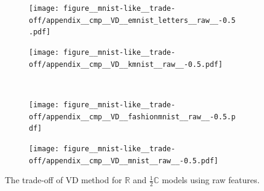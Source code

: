 \documentclass[a4paper]{extarticle}
\newcommand{\real}{\mathbb{R}}
\newcommand{\cplx}{\mathbb{C}}
\begin{document}
\begin{figure}[ht]
  \centering
  \begin{subfigure}[b]{0.5\textwidth}
    \centering
    \texttt{[image: figure\_\_mnist-like\_\_trade-off/appendix\_\_cmp\_\_VD\_\_emnist\_letters\_\_raw\_\_-0.5.pdf]}
  \end{subfigure}%
  \begin{subfigure}[b]{0.5\textwidth}
    \centering
    \texttt{[image: figure\_\_mnist-like\_\_trade-off/appendix\_\_cmp\_\_VD\_\_kmnist\_\_raw\_\_-0.5.pdf]}
  \end{subfigure} \\%
  \begin{subfigure}[b]{0.5\textwidth}
    \centering
    \texttt{[image: figure\_\_mnist-like\_\_trade-off/appendix\_\_cmp\_\_VD\_\_fashionmnist\_\_raw\_\_-0.5.pdf]}
  \end{subfigure}%
  \begin{subfigure}[b]{0.5\textwidth}
    \centering
    \texttt{[image: figure\_\_mnist-like\_\_trade-off/appendix\_\_cmp\_\_VD\_\_mnist\_\_raw\_\_-0.5.pdf]}
  \end{subfigure}
  \caption{%
    The trade-off of VD method for $\real$ and $\tfrac12\cplx$ models using raw features.
  }
  \label{fig:appendix__cmp__mnist-like__trade-off__VD__raw}
\end{figure}
\end{document}
